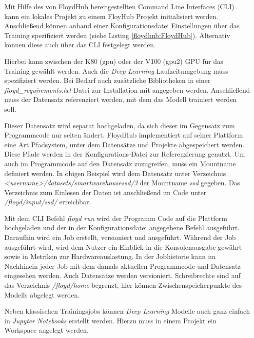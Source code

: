 Mit Hilfe des von FloydHub bereitgestellten Command Line Interfaces (CLI) kann ein lokales Projekt zu einem FloyHub Projekt initialisiert werden. Anschließend können anhand einer Konfigurationsdatei Einstellungen über das Training spezifiziert werden (siehe Listing \ref{floydhub:FloydHub}). Alternativ können diese auch über das CLI festgelegt werden. 

\lstset{language=XML}


Hierbei kann zwischen der K80 (gpu) oder der V100 (gpu2) GPU für das Training gewählt werden. Auch die \textit{Deep Learning} Laufzeitumgebung muss spezifiziert werden. Bei Bedarf auch zusätzliche Bibliotheken in einer \textit{floyd\_requirements.txt}-Datei zur Installation mit angegeben werden. Anschließend muss der Datensatz referenziert werden, mit dem das Modell trainiert werden soll. 

Dieser Datensatz wird separat hochgeladen, da sich dieser im Gegensatz zum Programmcode nur selten ändert. FloydHub implementiert auf seiner Plattform eine Art Pfadsystem, unter dem Datensätze und Projekte abgespeichert werden. Diese Pfade werden in der Konfigurations-Datei zur Referenzierung genutzt. Um auch im Programmcode auf den Datensatz zuzugreifen, muss ein Mountname definiert werden. In obigen Beispiel wird dem Datensatz unter Verzeichnis \textit{<username>/datasets/smartwarehousessd/3} der Mountname \textit{ssd} gegeben. Das Verzeichnis zum Einlesen der Daten ist anschließend im Code unter \textit{/floyd/input/ssd/} erreichbar. 

Mit dem CLI Befehl \textit{floyd run} wird der Programm Code auf die Plattform hochgeladen und der in der Konfigurationsdatei angegebene Befehl ausgeführt. Daraufhin wird ein Job erstellt, versioniert und ausgeführt. Während der Job ausgeführt wird, wird dem Nutzer ein Einblick in die Konsolenausgabe gewährt sowie in Metriken zur Hardwareauslastung. In der Jobhistorie kann im Nachhinein jeder Job mit dem damals aktuellen Programmcode und Datensatz eingesehen werden. Auch Datensätze werden versioniert. Schreibrechte sind auf das Verzeichnis \textit{/floyd/home} begrenzt, hier können Zwischenspeicherpunkte des Modells abgelegt werden. 

Neben klassischen Trainingsjobs können \textit{Deep Learning} Modelle auch ganz einfach in \textit{Jupyter Notebooks} erstellt werden. Hierzu muss in einem Projekt ein Workspace angelegt werden.

